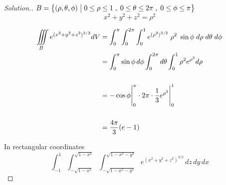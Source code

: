 \documentclass[11pt,a4paper]{article}
\theoremstyle{definition}
\newenvironment{solution}
  {\renewcommand{\qedsymbol}{}\begin{proof}[\textit{Solution}.]}
  {\end{proof}}
\begin{document}
\begin{solution}


$\displaystyle{ B = \big\{(\rho,\theta,\phi)\hspace{0.1cm} \big|\hspace{0.1cm} 0\leq \rho \leq 1 \hspace{0.1cm} , \hspace{0.1cm} 0 \leq \theta \leq 2\pi \hspace{0.1cm},\hspace{0.1cm} 0\leq \phi \leq \pi\big\}}$
$$x^2 + y^2 + z^2 = \rho^2$$

\begin{align*}
\iiint\limits_B e^{(x^2+y^2+z^2)^{3/2}} dV & = \int^{\pi}_0 \int^{2\pi}_0 \int^1_0 e^{(\rho^2)^{3/2}}\hspace{0.1cm} \rho^2 \hspace{0.1cm} \sin \phi \hspace{0.1cm} d\rho \hspace{0.1cm} d\theta \hspace{0.1cm} d\phi\\
& = \int^{\pi}_0\sin \phi\,d\phi \int^{2\pi}_0d\theta \int^1_0\rho^2 e^{\rho^3}d\rho\\\\
& = -\cos \phi \Bigg|^{\pi}_0\cdot 2\pi\cdot \frac{1}{3}e^{\rho^3}\Bigg|^1_0\\\\
& = \frac{4\pi}{3}(e -1)\\
\end{align*}

In rectangular coordinates
$$\int^1_{-1}\int^{\sqrt{1-x^2}}_{-\sqrt{1-x^2}}\int^{\sqrt{1-x^2 -y^2}}_{-\sqrt{1 - x^2 - y^2}}e^{(x^2+y^2+z^2)^{3/2}} \,dz\,dy\,dx$$
\end{solution}
\end{document}
